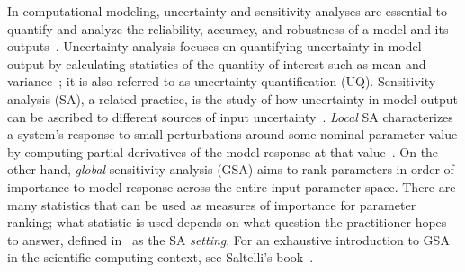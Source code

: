 In computational modeling, uncertainty and sensitivity analyses are essential to quantify and analyze the reliability, accuracy, and robustness of a model and its outputs~\cite{NAS-2012, dowding-2009, helton-2008}. 
Uncertainty analysis focuses on quantifying uncertainty in model output by calculating statistics of the quantity of interest such as mean and variance~\cite{saltelli-etal-2008, ghanem-uq-handbook}; it is also referred to as uncertainty quantification (UQ). 
Sensitivity analysis (SA), a related practice, is the study of how uncertainty in model output can be ascribed to different sources of input uncertainty~\cite{saltelli-sobol-1995}. 
\emph{Local} SA characterizes a system's response to small perturbations around some nominal parameter value by computing partial derivatives of the model response at that value~\cite{ionescu-cacuci-2004, cacuci-ionescu-2004}. 
On the other hand, \textit{global} sensitivity analysis (GSA) aims to rank parameters in order of importance to model response across the entire input parameter space. %
There are many statistics that can be used as measures of importance for parameter ranking; what statistic is used depends on what question the practitioner hopes to answer, defined in~\cite{saltelli-etal-2008} as the SA \textit{setting}. 
For an exhaustive introduction to GSA in the scientific computing context, see Saltelli's book~\cite{saltelli-etal-2008}. 

